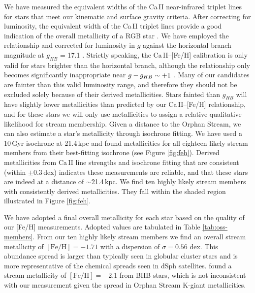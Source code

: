 \documentclass{emulateapj}
\begin{document}
We have measured the equivalent widths of the Ca\,\textsc{II} near-infrared triplet lines for stars that meet our kinematic and surface gravity criteria. After correcting for luminosity, the equivalent width of the Ca\,\textsc{II} triplet lines provide a good indication of the overall metallicity of a RGB star \citep{Amandroff;Da_Costa_1991}. We have employed the \citet{Starkenburg;et-al_2010} relationship and corrected for luminosity in $g$ against the horizontal branch magnitude at $g_{HB}$ = 17.1 \citep{Newberg;et-al_2010}. Strictly speaking, the Ca\,\textsc{II}\---[Fe/H] calibration is only valid for stars brighter than the horizontal branch, although the relationship only becomes significantly inappropriate near $g \-- g_{HB} \sim +1$ \citep{Saviane;et-al_2012}. Many of our candidates are fainter than this valid luminosity range, and therefore they should not be excluded solely because of their derived metallicities. Stars fainted than $g_{HB}$ will have slightly lower metallicities than predicted by our Ca\,\textsc{II}\---[Fe/H] relationship, and for these stars we will only use metallicities to assign a relative qualitative likelihood for stream membership.
Given a distance to the Orphan Stream, we can also estimate a star's metallicity through isochrone fitting. We have used a 10\,Gyr \citet{Girardi;et-al_2008} isochrone at 21.4\,kpc \citep{Newberg;et-al_2010} and found metallicities for all eighteen likely stream members from their best-fitting isochrone (see Figure \ref{fig:feh}). Derived metallicities from Ca\,\textsc{II} line strengths and isochrone fitting that are consistent (within $\pm0.3$\,dex) indicates these measurements are reliable, and that these stars are indeed at a distance of $\sim$21.4\,kpc. We find ten highly likely stream members with consistently derived metallicities. They fall within the shaded region illustrated in Figure \ref{fig:feh}. 

We have adopted a final overall metallicity for each star based on the quality of our [Fe/H] measurements. Adopted values are tabulated in Table \ref{tab:oss-members}. From our ten highly likely stream members we find an overall stream metallicity of $[\mbox{Fe/H}] = -1.71$ with a dispersion of $\sigma = 0.56$ dex. This abundance spread is larger than typically seen in globular cluster stars and is more representative of the chemical spreads seen in dSph satellites. \citet{Newberg;et-al_2010} found a stream metallicity of $[\mbox{Fe/H}] = -2.1$ from BHB stars, which is not inconsistent with our measurement given the spread in Orphan Stream K-giant metallicities.
\end{document}
